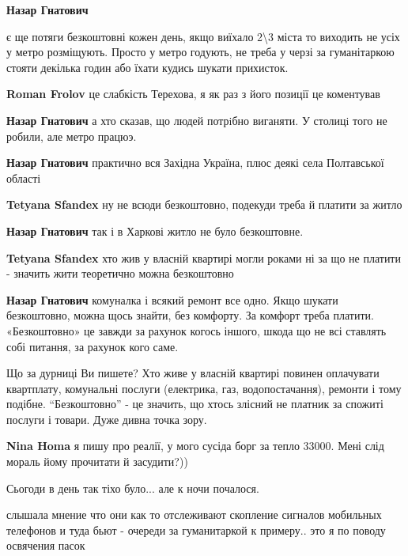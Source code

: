 \begin{itemize}
\begin{itemize}
\textbf{Назар Гнатович} 

є ще потяги безкоштовні кожен день, якщо виїхало 2\textbackslash 3 міста то виходить не усіх
у метро розміщують. Просто у метро годують, не треба у черзі за гуманітаркою
стояти декілька годин або їхати кудись шукати прихисток.

\textbf{Roman Frolov} це слабкість Терехова, я як раз з його позиції це коментував

\textbf{Назар Гнатович} а хто сказав, що людей потрiбно виганяти.
У столицi того не робили, але метро працюэ.

\textbf{Назар Гнатович} практично вся Західна Україна, плюс деякі села Полтавської області

\textbf{Tetyana Sfandex} ну не всюди безкоштовно, подекуди треба й платити за житло

\textbf{Назар Гнатович} так і в Харкові житло не було безкоштовне.

\textbf{Tetyana Sfandex} хто жив у власній квартирі могли роками ні за що не платити - значить жити теоретично можна безкоштовно

\textbf{Назар Гнатович} комуналка і всякий ремонт все одно.
Якщо шукати безкоштовно, можна щось знайти, без комфорту. За комфорт треба платити.
«Безкоштовно» це завжди за рахунок когось іншого, шкода що не всі ставлять собі питання, за рахунок кого саме.


Що за дурниці Ви пишете? Хто живе у власній квартирі повинен оплачувати
квартплату, комунальні послуги (електрика, газ, водопостачання), ремонти і тому
подібне. \enquote{Безкоштовно} - це значить, що хтось злісний не платник за спожиті
послуги і товари. Дуже дивна точка зору.

\textbf{Nina Homa} я пишу про реалії, у мого сусіда борг за тепло 33000. Мені слід мораль йому прочитати й засудити?))

\end{itemize} %

Сьогоди в день так тіхо було... але к ночи почалося.


слышала мнение что они как то отслеживают скопление сигналов мобильных
телефонов и туда бьют - очереди за гуманитаркой к примеру.. это я по поводу
освячения пасок


\end{itemize}
